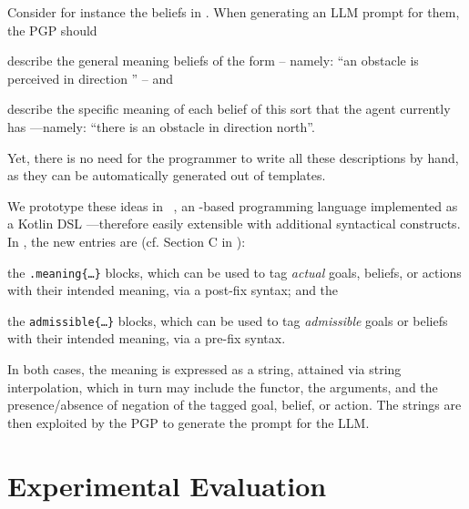 Consider for instance the  beliefs in .
%
When generating an \ac{LLM} prompt for them,
the \ac{PGP} should
\begin{inlinelist}
    \item describe the general meaning beliefs of the form 
    -- namely: ``an obstacle is perceived in direction '' --
    and
    \item describe the specific meaning of each belief of this sort that the agent currently has%
    ---namely: ``there is an obstacle in direction north''.
\end{inlinelist}
%
Yet,
there is no need for the programmer to write all these descriptions by hand,
as they can be automatically generated out of templates.

We prototype these ideas in \jakta{}~\cite{DBLP:journals/sncs/BaiardiBCP24},
an \agentspeak{}-based programming language
implemented as a Kotlin \ac{DSL}%
---therefore easily extensible with additional syntactical constructs.
%
In \jakta{},
% 
the new entries are (cf. Section C in \cite{ZenodoSupplementaryMaterial}):
\begin{inlinelist}
    \item the \texttt{.meaning\{\ldots\}} blocks,
    which can be used to tag \emph{actual} goals, beliefs, or actions with their intended meaning,
    via a post-fix syntax;
    and the
    \item the \texttt{admissible\{\ldots\}} blocks,
    which can be used to tag \emph{admissible} goals or beliefs with their intended meaning,
    via a pre-fix syntax.
\end{inlinelist}
%
In both cases,
the meaning is expressed as a string,
attained via string interpolation,
which in turn may include the functor, the arguments, and the presence/absence of negation
of the tagged goal, belief, or action.
%
The strings are then exploited by the \ac{PGP} to generate the prompt for the \ac{LLM}.

\section{Experimental Evaluation}\label{sec:experiments}

